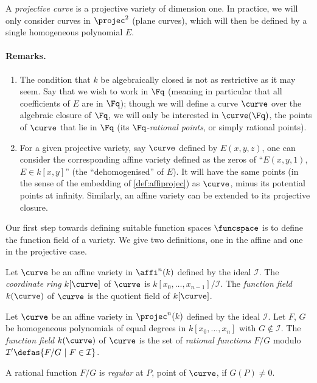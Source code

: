 A \emph{projective curve} is a projective variety of dimension one. In practice, we will only consider curves in $\projec^2$ (plane curves),
which will then be defined by a single homogeneous polynomial $E$.

\paragraph{Remarks.}
\begin{enumerate}
\item The condition that $k$ be algebraically closed is not as restrictive as it may seem. Say that we wish to work in $\Fq$ (meaning in particular
that all coefficients of $E$ are in $\Fq$); though we will define a curve $\curve$ over the algebraic closure of $\Fq$, we
will only be interested in $\curve(\Fq)$, the points of $\curve$ that lie in $\Fq$ (its \emph{$\Fq$-rational points}, or simply rational points). 
\item For a given projective variety, say $\curve$ defined by $E(x,y,z)$, one can consider the corresponding affine variety defined as the zeros of ``$E(x,y,1)$,
$E \in k[x,y]$'' (the ``dehomogenised'' of $E$). It will have the same points (in the sense of the embedding of \autoref{def:affiprojec}) as $\curve$, minus its potential points at infinity.
Similarly, an affine variety can be extended to its projective closure.
\end{enumerate}

Our first step towards defining suitable function spaces $\funcspace$ is to define the function field of a variety.
We give two definitions, one in the affine and one in the projective case.

\begin{defi}
Let $\curve$ be an affine variety in $\affi^n(k)$ defined by the ideal $\mathcal{I}$. The \emph{coordinate ring} $k[\curve]$ of $\curve$ is $k[x_0, \ldots, x_{n-1}]/\mathcal{I}$.
The \emph{function field} $k(\curve)$ of $\curve$ is the quotient field of $k[\curve]$.
\end{defi}

\begin{defi}
Let $\curve$ be an affine variety in $\projec^n(k)$ defined by the ideal $\mathcal{I}$. Let $F$, $G$ be homogeneous polynomials of equal degrees in $k[x_0, \ldots, x_n]$
with $G \notin \mathcal{I}$. The \emph{function field} $k(\curve)$ of $\curve$ is the set of \emph{rational functions} $F/G$ modulo $\mathcal{I'} \defas \{F/G~|~ F \in \mathcal{I}\}$.

\noindent
A rational function $F/G$ is \emph{regular} at $P$, point of $\curve$, if $G(P) \neq 0$.
\end{defi}


